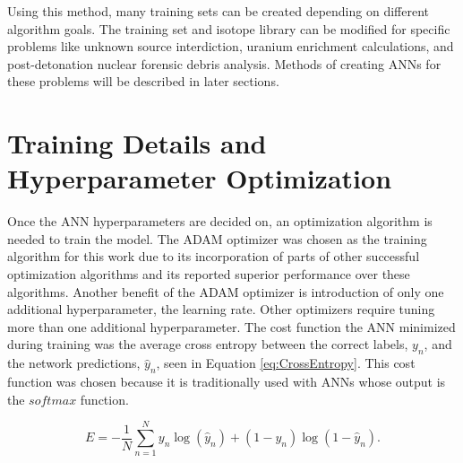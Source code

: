 \documentclass[thesis,tocnosub,noragright,centerchapter,12pt,fullpage]{uiucecethesis09}
\begin{document}
Using this method, many training sets can be created depending on different algorithm goals. The training set and isotope library can be modified for specific problems like unknown source interdiction, uranium enrichment calculations, and post-detonation nuclear forensic debris analysis. Methods of creating ANNs for these problems will be described in later sections.




\section{Training Details and Hyperparameter Optimization}

Once the ANN hyperparameters are decided on, an optimization algorithm is needed to train the model. The ADAM optimizer \cite{Kingma2015} was chosen as the training algorithm for this work due to its incorporation of parts of other successful optimization algorithms and its reported superior performance over these algorithms. Another benefit of the ADAM optimizer is introduction of only one additional hyperparameter, the learning rate. Other optimizers require tuning more than one additional hyperparameter. The cost function the ANN minimized during training was the average cross entropy between the correct labels, $y_n$, and the network predictions, $\hat{y}_n$, seen in Equation \ref{eq:CrossEntropy}. This cost function was chosen because it is traditionally used with ANNs whose output is the $softmax$ function. 

\begin{equation} \label{eq:CrossEntropy}
E = -{\frac{1} N} \sum_{n=1}^N y_n \log(\hat{y}_n) +  (1-y_n) \log(1-\hat{y}_n).
\end{equation}
\end{document}
